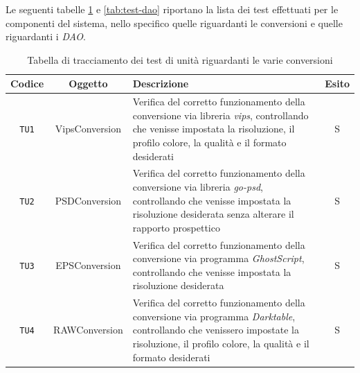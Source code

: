 Le seguenti tabelle \ref{tab:test-conversioni} e \ref{tab:test-dao} riportano la
lista dei test effettuati per le componenti del sistema, nello specifico quelle
riguardanti le conversioni e quelle riguardanti i \emph{DAO}.
\begin{table}[H]
    \caption{Tabella di tracciamento dei test di unità riguardanti le varie conversioni}
    \label{tab:test-conversioni}
    \centering
    \begin{tabularx}{\textwidth}{|c|c|X|c|}
        \hline
        \textbf{Codice}                  & \textbf{Oggetto} & \textbf{Descrizione}                                                                                                                                                                             & \textbf{Esito} \\
        \hline
        \verb|TU1|                       & VipsConversion   & Verifica del corretto funzionamento della conversione via libreria \emph{vips}, controllando che venisse impostata la risoluzione, il profilo colore, la qualità e il formato desiderati         & S              \\
        \hline
        \verb|TU2|                       & PSDConversion    & Verifica del corretto funzionamento
        della conversione via libreria \emph{go-psd}, controllando che venisse
        impostata la risoluzione desiderata senza
        alterare il rapporto prospettico & S                                                                                                                                                                                                                                    \\
        \hline
        \verb|TU3|                       & EPSConversion    & Verifica del corretto funzionamento della conversione via programma \emph{GhostScript}, controllando che venisse impostata la risoluzione desiderata                                             & S              \\
        \hline
        \verb|TU4|                       & RAWConversion    & Verifica del corretto funzionamento della conversione via programma \emph{Darktable}, controllando che venissero impostate la risoluzione, il profilo colore, la qualità e il formato desiderati & S              \\
        \hline
    \end{tabularx}
\end{table}

